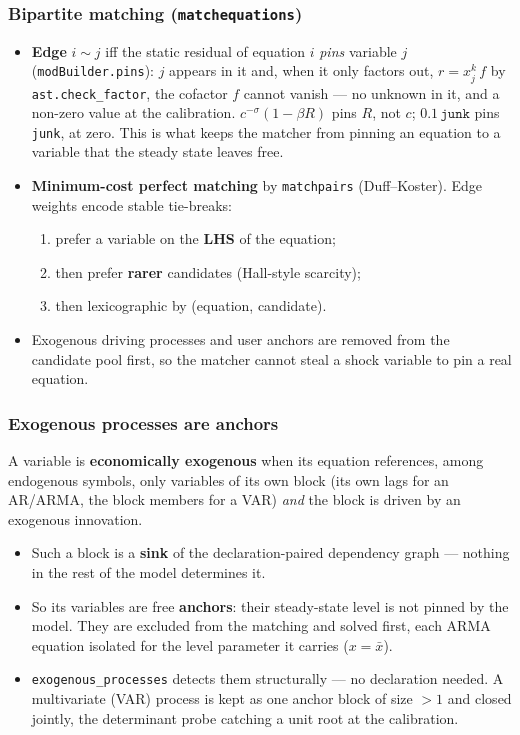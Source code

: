 \documentclass[10pt,slidestop]{beamer}
\newcommand{\code}[1]{\texttt{#1}}
\begin{document}
\begin{frame}\frametitle{Bipartite matching (\texttt{matchequations})}
  \begin{itemize}
  \item \textbf{Edge} $i \sim j$ iff the static residual of equation $i$
    \emph{pins} variable $j$ (\code{modBuilder.pins}): $j$ appears in it and, when
    it only factors out, $r = x_j^k\,f$ by \code{ast.check\_factor}, the cofactor $f$
    cannot vanish --- no unknown in it, and a non-zero value at the calibration.
    $c^{-\sigma}(1-\beta R)$ pins $R$, not $c$; $0.1\,\code{junk}$ pins \code{junk},
    at zero. This is what keeps the matcher from pinning an equation to a variable
    that the steady state leaves free.\newline
  \item \textbf{Minimum-cost perfect matching} by \code{matchpairs}
    (Duff--Koster). Edge weights encode stable tie-breaks:
    \begin{enumerate}\small
    \item prefer a variable on the \textbf{LHS} of the equation;
    \item then prefer \textbf{rarer} candidates (Hall-style scarcity);
    \item then lexicographic by (equation, candidate).
    \end{enumerate}
  \item Exogenous driving processes and user anchors are removed from the
    candidate pool first, so the matcher cannot steal a shock variable to pin a
    real equation.
  \end{itemize}
\end{frame}

\begin{frame}\frametitle{Exogenous processes are anchors}
  A variable is \textbf{economically exogenous} when its equation references,
  among endogenous symbols, only variables of its own block (its own lags for an
  AR/ARMA, the block members for a VAR) \emph{and} the block is driven by an
  exogenous innovation.

  \begin{itemize}
  \item Such a block is a \textbf{sink} of the declaration-paired dependency
    graph --- nothing in the rest of the model determines it.\newline
  \item So its variables are free \textbf{anchors}: their steady-state level is
    not pinned by the model. They are excluded from the matching and solved
    first, each ARMA equation isolated for the level parameter it carries
    ($x = \bar x$).\newline
  \item \code{exogenous\_processes} detects them structurally --- no declaration
    needed. A multivariate (VAR) process is kept as one anchor block of size
    $>1$ and closed jointly, the determinant probe catching a unit root at the
    calibration.
  \end{itemize}
\end{frame}
\end{document}
